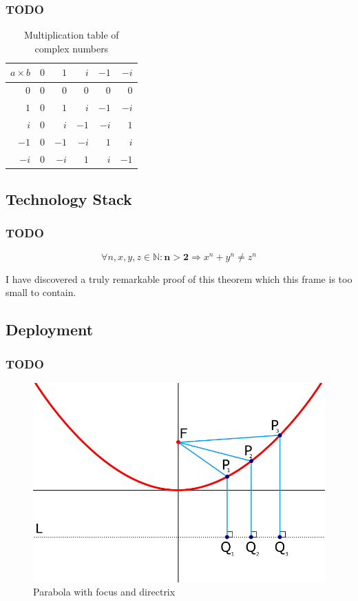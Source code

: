 \documentclass[aspectratio=169]{beamer}
\begin{document}
\begin{frame}
  \frametitle{TODO}
  \begin{table}[H]
    \begin{tabular}{r | r r r r r}
      $a \times b$ & $0$ &  $1$ &  $i$ & $-1$ & $-i$ \\ \hline
      $0$ & $0$ &  $0$ &  $0$ &  $0$ &  $0$ \\
      $1$ & $0$ &  $1$ &  $i$ & $-1$ & $-i$ \\
      $i$ & $0$ &  $i$ &  $-1$ & $-i$ &  $1$ \\
      $-1$ & $0$ & $-1$ &  $-i$ &  $1$ &  $i$ \\
      $-i$ & $0$ & $-i$ &  $1$ &  $i$ & $-1$ \\
    \end{tabular}
    \caption{Multiplication table of complex numbers}
  \end{table}
\end{frame}

\subsection{Technology Stack}

\begin{frame}
  \frametitle{TODO}
  \begin{theorem}
    \begin{equation}
      \forall n, x, y, z \in \mathbb{N}: \mathbf{n > 2} \Rightarrow x^n + y^n \neq z^n
    \end{equation}
  \end{theorem}
  I have discovered a truly remarkable proof of this theorem which this frame is too small to contain.
\end{frame}

\subsection{Deployment}

\begin{frame}
  \frametitle{TODO}
  \begin{figure}
    \includegraphics[scale=.3]{fig/parabola.png}
    \caption{Parabola with focus and directrix}
  \end{figure}
\end{frame}
\end{document}
